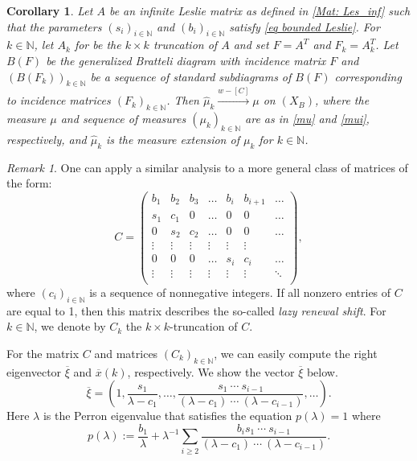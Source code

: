 \documentclass[11pt,reqno]{amsart}
\theoremstyle{definition}
\theoremstyle{remark}
\newtheorem{remark}[definition]{Remark}
\theoremstyle{plain}
\newtheorem{corol}[definition]{Corollary}
\def\ol{\overline}
\def\wh{\widehat}
\newcommand{\N}{\mathbb N}
\numberwithin{equation}{section}
\begin{document}
\begin{corol} Let $A$ be an infinite Leslie matrix as defined in \eqref{Mat: Les_inf} such that the parameters $(s_i)_{i \in \N}$ and $(b_i)_{i \in \N}$ satisfy \eqref{eq bounded Leslie}. For $k \in \N$, let $A_k$ for be the $k \times k$ truncation of $A$ and set $F = A^T$ and $F_k = A_k^T$. Let $B(F)$ be the generalized Bratteli diagram with incidence matrix $F$ and $(B(F_k))_{k \in \N}$ be a sequence of standard subdiagrams of $B(F)$ corresponding to incidence matrices $(F_k)_{k \in \N}$. Then $\wh \mu_k \xrightarrow{w-[C]} \mu$ on $(X_B)$, where  
the measure $\mu$ and sequence of measures $(\mu_k)_{k \in \N}$ are as in \eqref{mu} and \eqref{mui}, respectively, and $\wh \mu_k$ is the measure extension of $\mu_k$ for $k \in \N$. 
\end{corol}

\begin{remark}
One can apply a similar analysis to a more general class of matrices of the form:
$$
C = \begin{pmatrix}
b_1 & b_2 & b_3 &  \ldots & b_i & b_{i+1} &\ldots\\
s_1 & c_1& 0 &   \ldots & 0 & 0 &\ldots \\
0 &  s_2 & c_2 &   \ldots & 0 & 0 &\ldots \\
\vdots & \vdots & \vdots & \vdots & \vdots & \vdots & \\
0 & 0& 0& \ldots & s_i & c_i & \ldots \\
\vdots & \vdots & \vdots & \vdots & \vdots & \vdots & \ddots\\
\end{pmatrix},
$$
where $(c_i)_{i \in \N}$ is a sequence of nonnegative integers. If all nonzero entries of $C$ are equal to 1, then this matrix describes the so-called \textit{lazy renewal shift}. For $k \in \N$, we denote by $C_k$ the $k \times k$-truncation of $C$.

For the matrix $C$ and matrices $(C_k)_{k \in \N}$, we can easily compute the right eigenvector $\ol\xi$ and $\ol x(k)$, respectively. We show the vector $\ol\xi$ below.
$$
\ol\xi = \left(1, \frac{s_1}{\lambda - c_1}, \ldots, \frac{s_1\ \cdots\ s_{i-1}}{(\lambda - c_1) \ \cdots \ (\lambda - c_{i-1})}, \ldots\right). 
$$
Here $\lambda$ is the Perron eigenvalue that satisfies the equation $p(\lambda) =1$ where
$$
p(\lambda) := \frac{b_1}{\lambda} + \lambda^{-1} 
\sum_{i\geq 2} \frac{b_is_1\ \cdots\ s_{i-1}}{(\lambda - c_1) \ \cdots \ (\lambda - c_{i-1})}.
$$

\end{remark}
\end{document}
